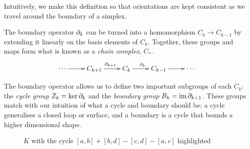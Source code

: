 Intuitively, we make this definition so that orientations are kept consistent as we travel around the boundary of a simplex.

The boundary operator $\partial_k$ can be turned into a homomorphism $C_k \to C_{k-1}$ by extending it linearly on the basis elements of $C_k$. Together, these groups and maps form what is known as a \emph{chain complex}, $C_*$.
\begin{displaymath}
\xymatrix{
\cdots \ar[r] & C_{k+1} \ar[r]^{\del_{k+1}} & C_{k} \ar[r]^{\del_k} & C_{k-1} \ar[r] & \cdots
}
\end{displaymath}

The boundary operator allows us to define two important subgroups of each $C_k$: the \emph{cycle group} $Z_k = \ker \partial_k$ and the \emph{boundary group} $B_k = \operatorname{im} \partial_{k+1}$. These groups match with our intuition of what a cycle and boundary should be; a cycle generalises a closed loop or surface, and a boundary is a cycle that bounds a higher dimensional shape.

\begin{figure}[h]
\centering
{}
\caption{$K$ with the cycle $[a, b] + [b, d] - [c, d] - [a, c]$ highlighted}
\label{fig:cycle}
\end{figure}

